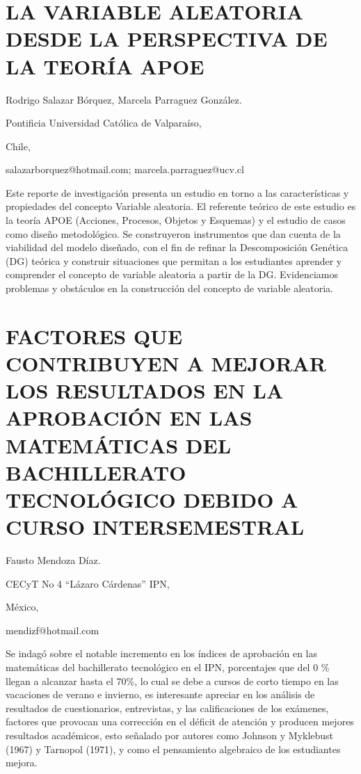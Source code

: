 \section{LA VARIABLE ALEATORIA DESDE LA PERSPECTIVA DE LA TEORÍA APOE }

\begin{datos}

Rodrigo Salazar Bórquez, Marcela Parraguez González.

Pontificia Universidad Católica de Valparaíso,

Chile,

salazarborquez@hotmail.com; marcela.parraguez@ucv.cl

\end{datos}

Este reporte de investigación presenta un estudio en torno a las características
y propiedades del concepto Variable aleatoria. El referente teórico
de este estudio es la teoría APOE (Acciones, Procesos, Objetos y Esquemas)
y el estudio de casos como diseño metodológico. Se construyeron instrumentos
que dan cuenta de la viabilidad del modelo diseñado, con el fin de
refinar la Descomposición Genética (DG) teórica y construir situaciones
que permitan a los estudiantes aprender y comprender el concepto de
variable aleatoria a partir de la DG. Evidenciamos problemas y obstáculos
en la construcción del concepto de variable aleatoria.


\section{FACTORES QUE CONTRIBUYEN A MEJORAR LOS RESULTADOS EN LA APROBACIÓN
EN LAS MATEMÁTICAS DEL BACHILLERATO TECNOLÓGICO DEBIDO A CURSO INTERSEMESTRAL }

\begin{datos}

Fausto Mendoza Díaz.

CECyT No 4 “Lázaro Cárdenas” IPN,

México,

mendizf@hotmail.com

\end{datos}

Se indagó sobre el notable incremento en los índices de aprobación
en las matemáticas del bachillerato tecnológico en el IPN, porcentajes
que del 0 \% llegan a alcanzar hasta el 70\%, lo cual se debe a cursos
de corto tiempo en las vacaciones de verano e invierno, es interesante
apreciar en los análisis de resultados de cuestionarios, entrevistas,
y las calificaciones de los exámenes, factores que provocan una corrección
en el déficit de atención y producen mejores resultados académicos,
esto señalado por autores como Johnson y Myklebust (1967) y Tarnopol
(1971), y como el pensamiento algebraico de los estudiantes mejora.


